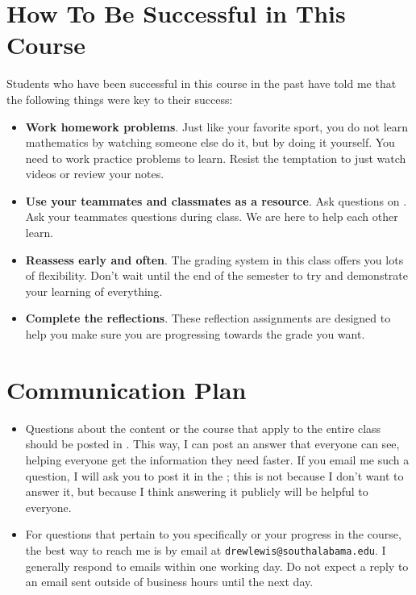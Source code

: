 \documentclass{article}
\begin{document}
\section*{\fontsize{12}{15}\selectfont How To Be Successful in This Course}
Students who have been successful in this course in the past have told me that the following things were key to their success:
\begin{itemize}
\item \textbf{Work homework problems}. Just like your favorite sport, you do not learn mathematics by watching someone else do it, but by doing it yourself. You need to work practice problems to learn. Resist the temptation to just watch videos or review your notes.
\item \textbf{Use your teammates and classmates as a resource}. Ask questions on \LMS. Ask your teammates questions during class. We are here to help each other learn.
\item \textbf{Reassess early and often}. The grading system in this class offers you lots of flexibility. Don't wait until the end of the semester to try and demonstrate your learning of everything.
\item \textbf{Complete the reflections}. These reflection assignments are designed to help you make sure you are progressing towards the grade you want. 
\end{itemize}

\section*{\fontsize{12}{15}\selectfont Communication Plan}

\begin{itemize}
\item Questions about the content or the course that apply to the entire class should be posted in \LMS. This way, I can post an answer that everyone can see, helping everyone get the information they need faster. If you email me such a question, I will ask you to post it in the \LMS ; this is not because I don't want to answer it, but because I think answering it publicly will be helpful to everyone.
\item For questions that pertain to you specifically or your progress in the course, the best way to reach me is by email at {\tt drewlewis@southalabama.edu}. I generally respond to emails within one working day.  Do not expect a reply to an email sent outside of business hours until the next day.
\end{itemize}
\end{document}
